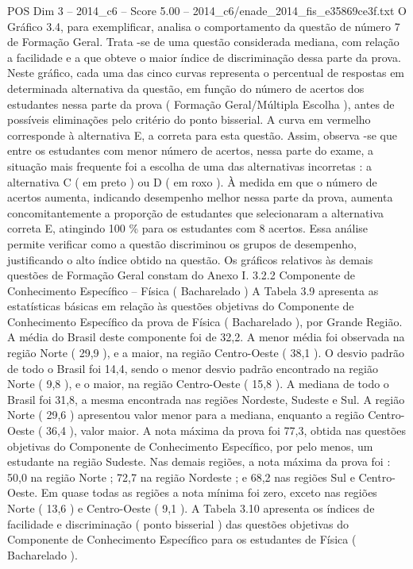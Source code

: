 \begin{textsample}{POS Dim 3 – 2014\_c6 – Score 5.00 – 2014\_c6/enade\_2014\_fis\_e35869ce3f.txt}
O Gráfico 3.4, para exemplificar, analisa o comportamento da questão de número 7 de Formação Geral.
Trata -se de uma questão considerada mediana, com relação a facilidade e a que obteve o maior índice de discriminação dessa parte da prova.
Neste gráfico, cada uma das cinco curvas representa o percentual de respostas em determinada alternativa da questão, em função do número de acertos dos estudantes nessa parte da prova ( Formação Geral/Múltipla Escolha ), antes de possíveis eliminações pelo critério do ponto bisserial.
A curva em vermelho corresponde à alternativa E, a correta para esta questão.
Assim, observa -se que entre os estudantes com menor número de acertos, nessa parte do exame, a situação mais frequente foi a escolha de uma das alternativas incorretas : a alternativa C ( em preto ) ou D ( em roxo ).
À medida em que o número de acertos aumenta, indicando desempenho melhor nessa parte da prova, aumenta concomitantemente a proporção de estudantes que selecionaram a alternativa correta E, atingindo 100 \% para os estudantes com 8 acertos.
Essa análise permite verificar como a questão discriminou os grupos de desempenho, justificando o alto índice obtido na questão.
Os gráficos relativos às demais questões de Formação Geral constam do Anexo I. 3.2.2 Componente de Conhecimento Específico – Física ( Bacharelado ) A Tabela 3.9 apresenta as estatísticas básicas em relação às questões objetivas do Componente de Conhecimento Específico da prova de Física ( Bacharelado ), por Grande Região.
A média do Brasil deste componente foi de 32,2.
A menor média foi observada na região Norte ( 29,9 ), e a maior, na região Centro-Oeste ( 38,1 ).
O desvio padrão de todo o Brasil foi 14,4, sendo o menor desvio padrão encontrado na região Norte ( 9,8 ), e o maior, na região Centro-Oeste ( 15,8 ).
A mediana de todo o Brasil foi 31,8, a mesma encontrada nas regiões Nordeste, Sudeste e Sul.
A região Norte ( 29,6 ) apresentou valor menor para a mediana, enquanto a região Centro-Oeste ( 36,4 ), valor maior.
A nota máxima da prova foi 77,3, obtida nas questões objetivas do Componente de Conhecimento Específico, por pelo menos, um estudante na região Sudeste.
Nas demais regiões, a nota máxima da prova foi : 50,0 na região Norte ; 72,7 na região Nordeste ; e 68,2 nas regiões Sul e Centro-Oeste.
Em quase todas as regiões a nota mínima foi zero, exceto nas regiões Norte ( 13,6 ) e Centro-Oeste ( 9,1 ).
A Tabela 3.10 apresenta os índices de facilidade e discriminação ( ponto bisserial ) das questões objetivas do Componente de Conhecimento Específico para os estudantes de Física ( Bacharelado ).

\end{textsample}
